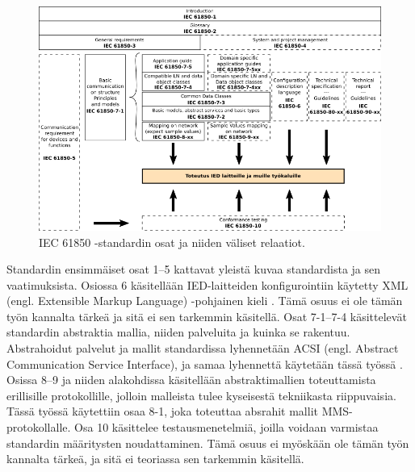 \begin{figure}[ht!]
	\includegraphics[width=1\textwidth]{pictures/iec61850-series-parts-and-relations.png}
	\caption{IEC 61850 -standardin osat ja niiden väliset relaatiot.}
	\label{fig:iec61850-osat-ja-relaatiot}
\end{figure}

Standardin ensimmäiset osat 1--5 kattavat yleistä kuvaa standardista ja sen vaatimuksista. Osiossa 6 käsitellään IED-laitteiden konfigurointiin käytetty XML (engl. Extensible Markup Language) -pohjainen kieli \cite[s.~7--8]{IEC61850-6}. Tämä osuus ei ole tämän työn kannalta tärkeä ja sitä ei sen tarkemmin käsitellä. Osat 7-1--7-4 käsittelevät standardin abstraktia mallia, niiden palveluita ja kuinka se rakentuu. Abstrahoidut palvelut ja mallit standardissa lyhennetään ACSI (engl. Abstract Communication Service Interface), ja samaa lyhennettä käytetään tässä työssä \cite[s.~72]{IEC61850-7-1}. Osissa 8--9 ja niiden alakohdissa käsitellään abstraktimallien toteuttamista erillisille protokollille, jolloin malleista tulee kyseisestä tekniikasta riippuvaisia. Tässä työssä käytettiin osaa 8-1, joka toteuttaa absrahit mallit MMS-protokollalle. Osa 10 käsittelee testausmenetelmiä, joilla voidaan varmistaa standardin määritysten noudattaminen. Tämä osuus ei myöskään ole tämän työn kannalta tärkeä, ja sitä ei teoriassa sen tarkemmin käsitellä. \cite[s.~15]{IEC61850-7-1}


